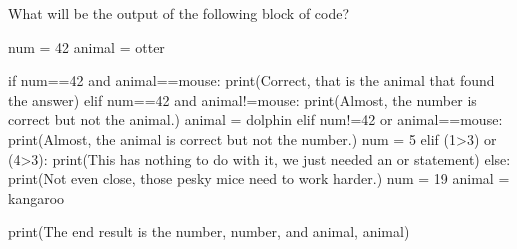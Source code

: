 \documentclass[
  letterpaper,
  DIV=11,
  numbers=noendperiod]{scrreprt}
\newenvironment{Shaded}{\begin{snugshade}}{\end{snugshade}}
\newcommand{\BuiltInTok}[1]{\textcolor[rgb]{0.00,0.23,0.31}{#1}}
\newcommand{\ControlFlowTok}[1]{\textcolor[rgb]{0.00,0.23,0.31}{#1}}
\newcommand{\DecValTok}[1]{\textcolor[rgb]{0.68,0.00,0.00}{#1}}
\newcommand{\KeywordTok}[1]{\textcolor[rgb]{0.00,0.23,0.31}{#1}}
\newcommand{\NormalTok}[1]{\textcolor[rgb]{0.00,0.23,0.31}{#1}}
\newcommand{\OperatorTok}[1]{\textcolor[rgb]{0.37,0.37,0.37}{#1}}
\newcommand{\StringTok}[1]{\textcolor[rgb]{0.13,0.47,0.30}{#1}}
\begin{document}
\begin{tcolorbox}[enhanced jigsaw, rightrule=.15mm, opacitybacktitle=0.6, colback=white, toprule=.15mm, colframe=quarto-callout-warning-color-frame, bottomtitle=1mm, bottomrule=.15mm, arc=.35mm, coltitle=black, breakable, title={Challenge 5}, titlerule=0mm, opacityback=0, colbacktitle=quarto-callout-warning-color!10!white, left=2mm, toptitle=1mm, leftrule=.75mm]

What will be the output of the following block of code?

\begin{Shaded}
\begin{Highlighting}[]
\NormalTok{num }\OperatorTok{=} \DecValTok{42} 
\NormalTok{animal }\OperatorTok{=} \StringTok{\textquotesingle{}otter\textquotesingle{}}

\ControlFlowTok{if}\NormalTok{ num}\OperatorTok{==}\DecValTok{42} \KeywordTok{and}\NormalTok{ animal}\OperatorTok{==}\StringTok{\textquotesingle{}mouse\textquotesingle{}}\NormalTok{:}
    \BuiltInTok{print}\NormalTok{(}\StringTok{\textquotesingle{}Correct, that is the animal that found the answer\textquotesingle{}}\NormalTok{)}
\ControlFlowTok{elif}\NormalTok{ num}\OperatorTok{==}\DecValTok{42} \KeywordTok{and}\NormalTok{ animal}\OperatorTok{!=}\StringTok{\textquotesingle{}mouse\textquotesingle{}}\NormalTok{:}
    \BuiltInTok{print}\NormalTok{(}\StringTok{\textquotesingle{}Almost, the number is correct but not the animal.\textquotesingle{}}\NormalTok{)}
\NormalTok{    animal }\OperatorTok{=} \StringTok{\textquotesingle{}dolphin\textquotesingle{}}
\ControlFlowTok{elif}\NormalTok{ num}\OperatorTok{!=}\DecValTok{42} \KeywordTok{or}\NormalTok{ animal}\OperatorTok{==}\StringTok{\textquotesingle{}mouse\textquotesingle{}}\NormalTok{:}
    \BuiltInTok{print}\NormalTok{(}\StringTok{\textquotesingle{}Almost, the animal is correct but not the number.\textquotesingle{}}\NormalTok{)}
\NormalTok{    num }\OperatorTok{=} \DecValTok{5}
\ControlFlowTok{elif}\NormalTok{ (}\DecValTok{1}\OperatorTok{\textgreater{}}\DecValTok{3}\NormalTok{) }\KeywordTok{or}\NormalTok{ (}\DecValTok{4}\OperatorTok{\textgreater{}}\DecValTok{3}\NormalTok{):}
    \BuiltInTok{print}\NormalTok{(}\StringTok{\textquotesingle{}This has nothing to do with it, we just needed an or statement\textquotesingle{}}\NormalTok{)}
\ControlFlowTok{else}\NormalTok{:}
    \BuiltInTok{print}\NormalTok{(}\StringTok{\textquotesingle{}Not even close, those pesky mice need to work harder.\textquotesingle{}}\NormalTok{)}
\NormalTok{    num }\OperatorTok{=} \DecValTok{19}
\NormalTok{    animal }\OperatorTok{=} \StringTok{\textquotesingle{}kangaroo\textquotesingle{}}

\BuiltInTok{print}\NormalTok{(}\StringTok{\textquotesingle{}The end result is the number\textquotesingle{}}\NormalTok{, number, }\StringTok{\textquotesingle{}and animal\textquotesingle{}}\NormalTok{, animal)}
\end{Highlighting}
\end{Shaded}

\end{tcolorbox}
\end{document}

